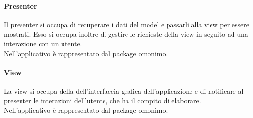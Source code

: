 \documentclass[../Tesi.tex]{subfiles}
\begin{document}
		\paragraph*{Presenter}
		Il presenter si occupa di recuperare i dati del model e passarli alla view per essere mostrati. Esso si occupa inoltre di gestire le richieste della view in seguito ad una interazione con un utente. \\ Nell'applicativo è rappresentato dal package omonimo.

		\paragraph*{View}
		La view si occupa della dell'interfaccia grafica dell'applicazione e di notificare al presenter le interazioni dell'utente, che ha il compito di elaborare. \\ Nell'applicativo è rappresentato dal package omonimo.
	
\end{document}
